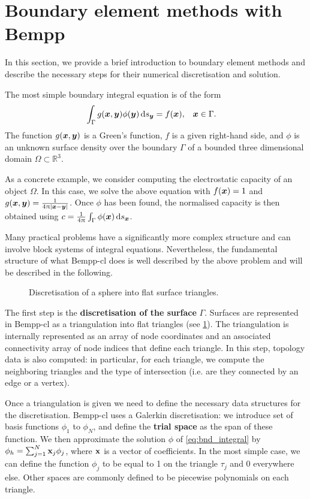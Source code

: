 \section{Boundary element methods with Bempp}
In this section, we provide a brief introduction to boundary element methods and describe the necessary steps for their numerical discretisation and solution.

The most simple boundary integral equation is of the form
\begin{align}
  \label{eq:bnd_integral}
  \int_{\Gamma} g(\bx, \by)\phi(\by)\ds[\by] &= f(\bx),&&\bx\in\Gamma.
\end{align}
The function $g(\boldsymbol{x}, \boldsymbol{y})$ is a Green's function, $f$ is a given right-hand side, and $\phi$ is an unknown surface density over the boundary $\Gamma$ of a bounded three dimensional domain $\Omega\subset\mathbb{R}^3$.

As a concrete example, we consider computing the electrostatic capacity of an object $\Omega$. In this case, we solve the above equation with $f(\boldsymbol{x})=1$ and $g(\boldsymbol{x},\boldsymbol{y})=\frac{1}{4\uppi|\boldsymbol{x} - \boldsymbol{y}|}$. Once $\phi$ has been found, the normalised capacity is then obtained using $c = \frac{1}{4\uppi}\int_{\Gamma}\phi(\bx)\ds[\bx]$.

Many practical problems have a significantly more complex structure and can involve block systems of integral equations. Nevertheless, the fundamental structure of what Bempp-cl does is well described by the above problem and will be described in the following.

\begin{figure}
  \centering
  
  \caption{Discretisation of a sphere into flat surface triangles.}
  \label{fig:triangulation}
\end{figure}

The first step is the \textbf{discretisation of the surface} $\Gamma$. Surfaces are represented in Bempp-cl as a triangulation into flat triangles (see \cref{fig:triangulation}). The triangulation is internally represented as an array of node coordinates and an associated connectivity array of node indices that define each triangle. In this step, topology data is also computed: in particular, for each triangle, we compute the neighboring triangles and the type of intersection (i.e. are they connected by an edge or a vertex).

Once a triangulation is given we need to define the necessary data structures for the discretisation. Bempp-cl uses a Galerkin discretisation: we introduce set of basis functions \(\phi_1\) to \(\phi_N\), and define the \textbf{trial space} as the span of these function. We then approximate the solution \(\phi\) of \cref{eq:bnd_integral} by $\phi_h=\sum_{j=1}^N \mathbf{x}_j\phi_j$, where $\mathbf{x}$ is a vector of coefficients. In the most simple case, we can define the function \(\phi_j\) to be equal to 1 on the triangle $\tau_j$ and 0 everywhere else. Other spaces are commonly defined to be piecewise polynomials on each triangle.


